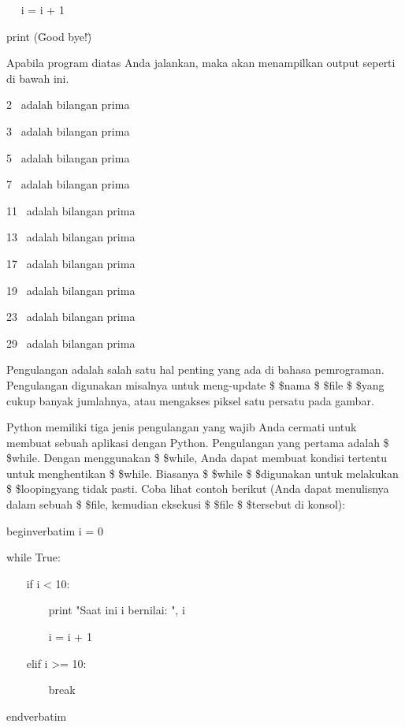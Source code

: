~~ i = i + 1 \par
\vspace{12pt}
print (\"Good bye!\") \par
\vspace{12pt}
\vspace{\baselineskip}
Apabila program diatas Anda jalankan, maka akan menampilkan output seperti di bawah ini.\vspace{\baselineskip}
\vspace{\baselineskip}
 \par
2~ adalah bilangan prima \par
3~ adalah bilangan prima \par
5~ adalah bilangan prima \par
7~ adalah bilangan prima \par
11~ adalah bilangan prima \par
13~ adalah bilangan prima \par
17~ adalah bilangan prima \par
19~ adalah bilangan prima \par
23~ adalah bilangan prima \par
29~ adalah bilangan prima \par
\vspace{12pt}
Pengulangan adalah salah satu hal penting yang ada di bahasa pemrograman. Pengulangan digunakan misalnya untuk meng-update \$  \$nama \$  \$file \$  \$yang cukup banyak jumlahnya, atau mengakses piksel satu persatu pada gambar. \par
Python memiliki tiga jenis pengulangan yang wajib Anda cermati untuk membuat sebuah aplikasi dengan Python. Pengulangan yang pertama adalah \$  \$while. Dengan menggunakan \$  \$while, Anda dapat membuat kondisi tertentu untuk menghentikan \$  \$while. Biasanya \$  \$while \$  \$digunakan untuk melakukan \$  \$loopingyang tidak pasti. Coba lihat contoh berikut (Anda dapat menulisnya dalam sebuah \$  \$file, kemudian eksekusi \$  \$file \$  \$tersebut di konsol): \par
begin{verbatim}
i = 0 \par
while True: \par
~~~ if i < 10: \par
~~~~~~~ print "Saat ini i bernilai: ", i \par
~~~~~~~ i = i + 1 \par
~~~ elif i >= 10: \par
~~~~~~~ break \par
end{verbatim}
\vspace{12pt}
